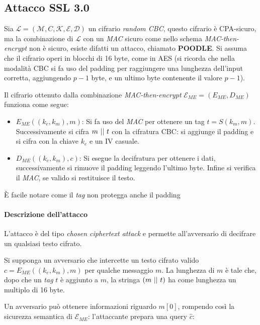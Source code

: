 \subsection{Attacco SSL 3.0}
Sia $\mathcal{L} = (\mathcal{M},C,\mathcal{K},\mathcal{E},\mathcal{D})$ un cifrario \emph{random CBC}, questo cifrario è CPA-sicuro, ma la combinazione di $\mathcal{L}$ con un \emph{MAC} sicuro come nello schema \emph{MAC-then-encrypt} non è sicuro, esiste difatti un attacco, chiamato \textbf{POODLE}. Si assuma che il cifrario operi in blocchi di 16 byte, come in AES (si ricorda che nella modalità CBC si fa uso del padding per raggiungere una lunghezza dell'input corretta, aggiungendo $p-1$ byte, e un ultimo byte contenente il valore $p-1$). 

\vspace{1em}\noindent
Il cifrario ottenuto dalla combinazione \emph{MAC-then-encrypt} $\mathcal{E}_{ME} = (E_{ME},D_{ME})$ funziona come segue:
\begin{itemize}
    \item $E_{ME}((k_e,k_m),m)$: Si fa uso del \emph{MAC} per ottenere un tag $t= S(k_m,m)$. Successivamente si cifra $m \operatorname{\,||\,} t$ con la cifratura CBC: si aggiunge il padding e si cifra con la chiave $k_e$ e un IV casuale.
    \item $D_{ME}((k_e,k_m),c)$: Si esegue la decifratura per ottenere i dati, successivamente si rimuove il padding leggendo l'ultimo byte. Infine si verifica il \emph{MAC}, se valido si restituisce il testo.
\end{itemize}
È facile notare come il \emph{tag} non protegga anche il padding

\paragraph{Descrizione dell'attacco}
L'attacco è del tipo \emph{chosen ciphertext attack} e permette all'avversario di decifrare un qualsiasi testo cifrato. 

Si supponga un avversario che intercette un testo cifrato valido $c = E_{ME}((k_e,k_m),m)$ per qualche messaggio $m$. La lunghezza di $m$ è tale che, dopo che un \emph{tag} $t$ è aggiunto a $m$, la stringa $(m \operatorname{\,||\,} t)$ ha come lunghezza un multiplo di 16 byte. 

\vspace{1em}
Un avversario può ottenere informazioni riguardo $m[0]$, rompendo così la sicurezza semantica di $\mathcal{E}_{ME}$: l'attaccante prepara una query $\hat{c}$:

